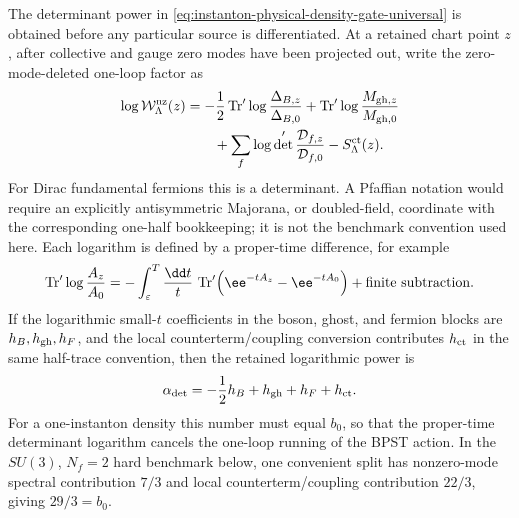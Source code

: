 \begin{controlledapproximation}
\label{ca:instanton-proper-time-determinant-channel}
The determinant power in
\eqref{eq:instanton-physical-density-gate-universal} is obtained before any
particular source is differentiated.  At a retained chart point \(z\), after
collective and gauge zero modes have been projected out, write the
zero-mode-deleted one-loop factor as
\begin{equation}
\begin{aligned}
  \log\mathcal W^{\rm nz}_{\Lambda}(z)
  &=
  -\frac12\operatorname{Tr}'\log
  \frac{\Delta_{B,z}}{\Delta_{B,0}}
  +\operatorname{Tr}'\log
  \frac{M_{{\rm gh},z}}{M_{{\rm gh},0}}                  \\
  &\qquad
  +\sum_f\log\det'
  \frac{\mathcal D_{f,z}}{\mathcal D_{f,0}}
  -S^{\rm ct}_{\Lambda}(z).
\end{aligned}
  \label{eq:instanton-proper-time-log-determinant-channel}
\end{equation}
For Dirac fundamental fermions this is a determinant.  A Pfaffian notation
would require an explicitly antisymmetric Majorana, or doubled-field,
coordinate with the corresponding one-half bookkeeping; it is not the
benchmark convention used here.
Each logarithm is defined by a proper-time difference, for example
\[
  \operatorname{Tr}'\log\frac{A_z}{A_0}
  =
  -\int_{\varepsilon}^{T}
  \frac{\dd t}{t}\,
  \operatorname{Tr}'\!\left(\ee^{-tA_z}-\ee^{-tA_0}\right)
  +\hbox{finite subtraction}.
\]
If the logarithmic small-\(t\) coefficients in the boson, ghost, and fermion
blocks are \(h_B,h_{\rm gh},h_F\), and the local counterterm/coupling
conversion contributes \(h_{\rm ct}\) in the same half-trace convention, then
the retained logarithmic power is
\begin{equation}
  \alpha_{\rm det}
  =
  -\frac12 h_B+h_{\rm gh}+h_F+h_{\rm ct}.
  \label{eq:instanton-proper-time-channel-log-power}
\end{equation}
For a one-instanton density this number must equal \(b_0\), so that the
proper-time determinant logarithm cancels the one-loop running of the BPST
action.  In the \(SU(3)\), \(N_f=2\) hard benchmark below, one convenient
split has nonzero-mode spectral contribution \(7/3\) and local
counterterm/coupling contribution \(22/3\), giving \(29/3=b_0\).


\end{controlledapproximation}
